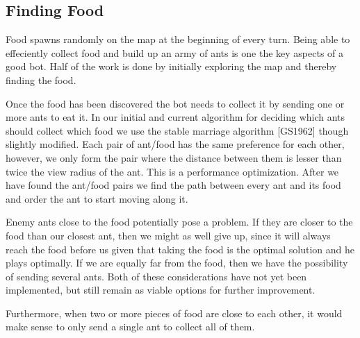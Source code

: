 \subsection{Finding Food}
Food spawns randomly on the map at the beginning of every turn. Being able to effeciently collect food and build up an army of ants is one the key aspects of a good bot. Half of the work is done by initially exploring the map and thereby finding the food.

Once the food has been discovered the bot needs to collect it by sending one or more ants to eat it. In our initial and current algorithm for deciding which ants should collect which food we use the stable marriage algorithm [GS1962] though slightly modified. Each pair of ant/food has the same preference for each other, however, we only form the pair where the distance between them is lesser than twice the view radius of the ant. This is a performance optimization. After we have found the ant/food pairs we find the path between every ant and its food and order the ant to start moving along it.

Enemy ants close to the food potentially pose a problem. If they are closer to the food than our closest ant, then we might as well give up, since it will always reach the food before us given that taking the food is the optimal solution and he plays optimally. If we are equally far from the food, then we have the possibility of sending several ants. Both of these considerations have not yet been implemented, but still remain as viable options for further improvement.

Furthermore, when two or more pieces of food are close to each other, it would make sense to only send a single ant to collect all of them.  